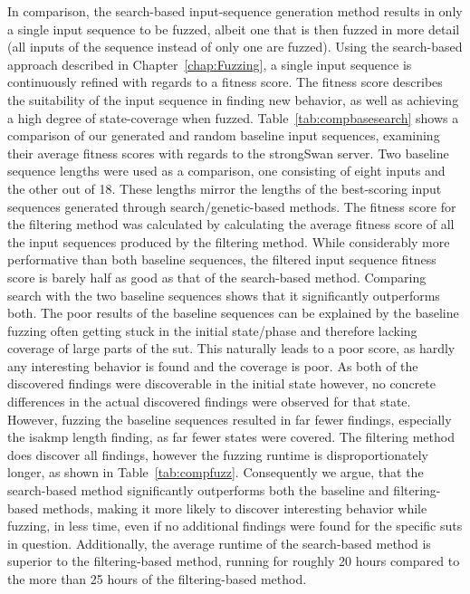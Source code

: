 In comparison, the search-based input-sequence generation method results in only a single input sequence to be fuzzed, albeit one that is then fuzzed in more detail (all inputs of the sequence instead of only one are fuzzed). Using the search-based approach described in Chapter~\ref{chap:Fuzzing}, a single input sequence is continuously refined with regards to a fitness score. The fitness score describes the suitability of the input sequence in finding new behavior, as well as achieving a high degree of state-coverage when fuzzed. Table~\ref{tab:compbasesearch} shows a comparison of our generated and random baseline input sequences, examining their average fitness scores with regards to the strongSwan server. Two baseline sequence lengths were used as a comparison, one consisting of eight inputs and the other out of 18. These lengths mirror the lengths of the best-scoring input sequences generated through search/genetic-based methods. The fitness score for the filtering method was calculated by calculating the average fitness score of all the input sequences produced by the filtering method. While considerably more performative than both baseline sequences, the filtered input sequence fitness score is barely half as good as that of the search-based method. Comparing search with the two baseline sequences shows that it significantly outperforms both. The poor results of the baseline sequences can be explained by the baseline fuzzing often getting stuck in the initial state/phase and therefore lacking coverage of large parts of the \ac{sut}. This naturally leads to a poor score, as hardly any interesting behavior is found and the coverage is poor. As both of the discovered findings were discoverable in the initial state however, no concrete differences in the actual discovered findings were observed for that state. However, fuzzing the baseline sequences resulted in far fewer findings, especially the \ac{isakmp} length finding, as far fewer states were covered. The filtering method does discover all findings, however the fuzzing runtime is disproportionately longer, as shown in Table~\ref{tab:compfuzz}. Consequently we argue, that the search-based method significantly outperforms both the baseline and filtering-based methods, making it more likely to discover interesting behavior while fuzzing, in less time, even if no additional findings were found for the specific \acp{sut} in question. Additionally, the average runtime of the search-based method is superior to the filtering-based method, running for roughly 20 hours compared to the more than 25 hours of the filtering-based method.

